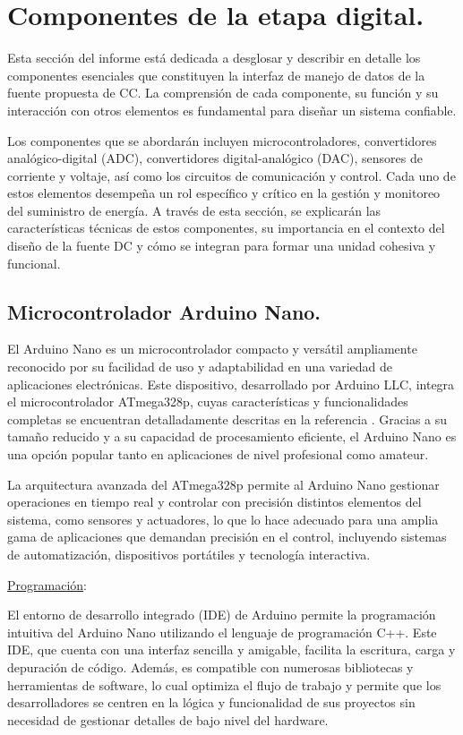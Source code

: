 \section{Componentes de la etapa digital.}
Esta sección del informe está dedicada a desglosar y describir en detalle los componentes esenciales que constituyen la interfaz de manejo de datos de la fuente propuesta de CC. La comprensión de cada componente, su función y su interacción con otros elementos es fundamental para diseñar un sistema confiable.\par 
Los componentes que se abordarán incluyen microcontroladores, convertidores analógico-digital (ADC), convertidores digital-analógico (DAC), sensores de corriente y voltaje, así como los circuitos de comunicación y control. Cada uno de estos elementos desempeña un rol específico y crítico en la gestión y monitoreo del suministro de energía. A través de esta sección, se explicarán las características técnicas de estos componentes, su importancia en el contexto del diseño de la fuente DC y cómo se integran para formar una unidad cohesiva y funcional.\par 

\subsection{Microcontrolador Arduino Nano.}
El Arduino Nano es un microcontrolador compacto y versátil ampliamente reconocido por su facilidad de uso y adaptabilidad en una variedad de aplicaciones electrónicas. Este dispositivo, desarrollado por Arduino LLC, integra el microcontrolador ATmega328p, cuyas características y funcionalidades completas se encuentran detalladamente descritas en la referencia \cite{Atmega328p}. Gracias a su tamaño reducido y a su capacidad de procesamiento eficiente, el Arduino Nano es una opción popular tanto en aplicaciones de nivel profesional como amateur. \par 
La arquitectura avanzada del ATmega328p permite al Arduino Nano gestionar operaciones en tiempo real y controlar con precisión distintos elementos del sistema, como sensores y actuadores, lo que lo hace adecuado para una amplia gama de aplicaciones que demandan precisión en el control, incluyendo sistemas de automatización, dispositivos portátiles y tecnología interactiva.\cite{ArduinoDATASHEET}\par 

\underline{Programación}: \par 
El entorno de desarrollo integrado (IDE) de Arduino permite la programación intuitiva del Arduino Nano utilizando el lenguaje de programación C++. Este IDE, que cuenta con una interfaz sencilla y amigable, facilita la escritura, carga y depuración de código. Además, es compatible con numerosas bibliotecas y herramientas de software, lo cual optimiza el flujo de trabajo y permite que los desarrolladores se centren en la lógica y funcionalidad de sus proyectos sin necesidad de gestionar detalles de bajo nivel del hardware. \par 

